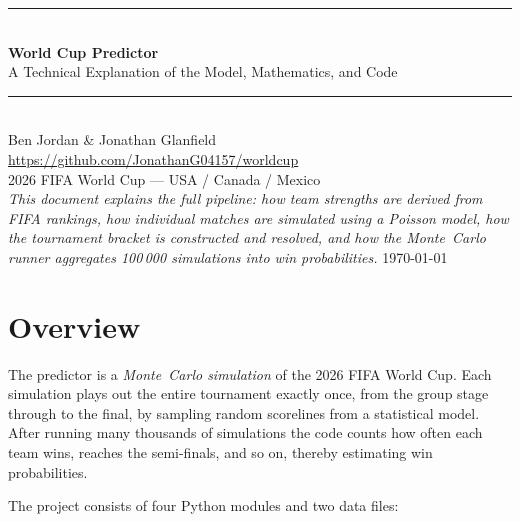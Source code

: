 \documentclass[12pt,a4paper]{article}
\begin{document}
\begin{titlepage}
  \centering
  \vspace*{2cm}
  {\color{fifablue}\rule{\linewidth}{1pt}}\\[0.4em]
  {\huge\bfseries\color{fifablue} World Cup Predictor}\\[0.4em]
  {\large A Technical Explanation of the Model, Mathematics, and Code}\\[0.2em]
  {\color{fifablue}\rule{\linewidth}{1pt}}\\[1.5em]
  {\large Ben Jordan \& Jonathan Glanfield}\\[0.5em]
  {\normalsize \url{https://github.com/JonathanG04157/worldcup}}\\[0.5em]
  {\normalsize 2026 FIFA World Cup --- USA / Canada / Mexico}\\[2cm]
  {\small\itshape This document explains the full pipeline: how team
  strengths are derived from FIFA rankings, how individual matches are
  simulated using a Poisson model, how the tournament bracket is
  constructed and resolved, and how the Monte~Carlo runner aggregates
  100\,000 simulations into win probabilities.}
  \vfill
  {\small \today}
\end{titlepage}

\tableofcontents
\newpage

\section{Overview}

The predictor is a \emph{Monte~Carlo simulation} of the 2026 FIFA World
Cup.  Each simulation plays out the entire tournament exactly once,
from the group stage through to the final, by sampling random scorelines
from a statistical model.  After running many thousands of simulations
the code counts how often each team wins, reaches the semi-finals, and so
on, thereby estimating win probabilities.

The project consists of four Python modules and two data files:
\end{document}
